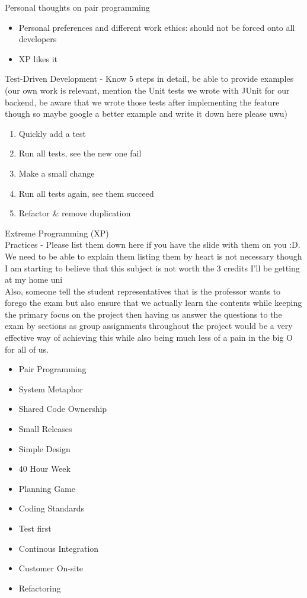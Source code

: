 \documentclass[10pt]{article}
\begin{document}
Personal thoughts on pair programming
\begin{itemize}
\item Personal preferences and different work ethics: should not be forced onto all developers 
\item XP likes it
\end{itemize}
Test-Driven Development - Know 5 steps in detail, be able to provide examples (our own work is relevant, mention the Unit tests we wrote with JUnit for our backend, be aware that we wrote those tests after implementing the feature though so maybe google a better example and write it down here please uwu)
\begin{enumerate}
\item Quickly add a test
\item Run all tests, see the new one fail
\item Make a small change
\item Run all tests again, see them succeed
\item Refactor \& remove duplication
\end{enumerate}
Extreme Programming (XP)\\
Practices - Please list them down here if you have the slide with them on you :D. We need to be able to explain them listing them by heart is not necessary though\\
I am starting to believe that this subject is not worth the 3 credits I'll be getting at my home uni\\
Also, someone tell the student representatives that is the professor wants to forego the exam but also ensure that we actually learn the contents while keeping the primary focus on the project then having us answer the questions to the exam by sections as group assignments throughout the project would be a very effective way of achieving this while also being much less of a pain in the big O for all of us.
\begin{itemize}
    \item Pair Programming 
    \item System Metaphor
    \item Shared Code Ownership
    \item Small Releases
    \item Simple Design
    \item 40 Hour Week
    \item Planning Game
    \item Coding Standards
    \item Test first
    \item Continous Integration 
    \item Customer On-site
    \item Refactoring
\end{itemize}
\end{document}
